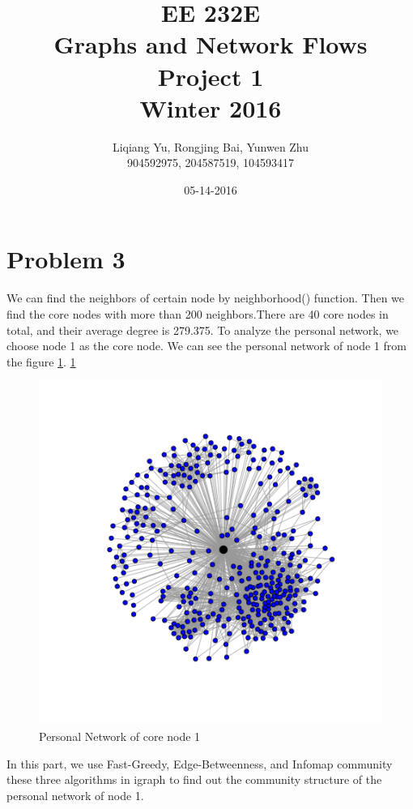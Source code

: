 \documentclass{article}
\begin{document}
\begin{titlepage}
\title{EE 232E \\Graphs and Network Flows\\Project 1\\Winter 2016} 
\author{Liqiang Yu, Rongjing Bai, Yunwen Zhu\\
904592975, 204587519, 104593417}  %
\date{05-14-2016}
\end{titlepage}
\maketitle
\newpage
\tableofcontents
\newpage
\section{Problem 3}
We can find the neighbors of certain node by neighborhood() function. Then we find the core nodes with more than 200 neighbors.There are 40 core nodes in total, and their average degree is 279.375.
To analyze the personal network, we choose node 1 as the core node. We can see the personal network of node 1 from the figure \ref{fig:p3_1}.
\ref{fig:p3_1}
\begin{figure}[htbp]
\centering
\includegraphics[width=.8\textwidth]{3_1.png}
\caption{Personal Network of core node 1}
\label{fig:p3_1}
\end{figure}
In this part, we use Fast-Greedy, Edge-Betweenness, and Infomap community these three algorithms in igraph to find out the community structure of the personal network of node 1. 
\end{document}
